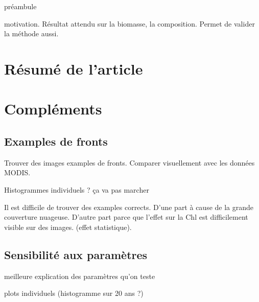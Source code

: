 
\label{chp:res-chl}
\graphicspath{{resources/res_chl}}

\minitoc%
\clearpage

préambule

motivation.
Résultat attendu sur la biomasse, la composition.
Permet de valider la méthode aussi.

\section{Résumé de l'article}
\label{sec:resume-article}

\insertArticle{}

\section{Compléments}
\label{sec:complements-chl}

\subsection{Examples de fronts}
\label{sec:examples-fronts}

Trouver des images examples de fronts.
Comparer visuellement avec les données MODIS.

Histogrammes individuels ? ça va pas marcher

Il est difficile de trouver des examples corrects.
D'une part à cause de la grande couverture nuageuse.
D'autre part parce que l'effet sur la Chl est difficilement visible sur des images. (effet statistique).

\subsection{Sensibilité aux paramètres}
\label{sec:sensibilite-parametres}

meilleure explication des paramètres qu'on teste

plots individuels (histogramme sur 20 ans ?)

